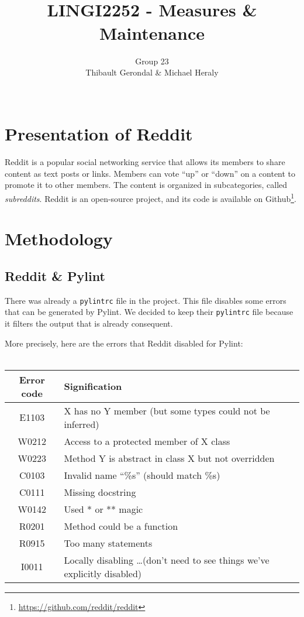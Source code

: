 \documentclass[11pt, a4paper]{article}
\title{\tbf{UCL} \\
	LINGI2252 - Measures \& Maintenance}
\author{Group 23 \\
		Thibault Gerondal \& Michael Heraly \\
		\\
		\tit{Teacher: Kim Mens}}
\newcommand{\tit}[1]{\textit{#1}}
\newcommand{\pyl}{\textsf{Pylint}}
\begin{document}
\maketitle

\thispagestyle{empty}


\newpage
\section*{Presentation of Reddit}

Reddit is a popular social networking service that allows its members to share content as text posts or links.
Members can vote ``up'' or ``down'' on a content to promote it to other members.
The content is organized in subcategories, called \tit{subreddits}.
Reddit is an open-source project, and its code is available on Github\footnote{\url{https://github.com/reddit/reddit}}.


\section{Methodology}

\subsection*{Reddit \& \pyl{}}

There was already a \texttt{pylintrc} file in the project.
This file disables some errors that can be generated by \pyl{}.
We decided to keep their \texttt{pylintrc} file because it filters the output that is already consequent.

\smallskip
More precisely, here are the errors that Reddit disabled for \pyl{}: \\
\\
\begin{tabular}{|c|m{10cm}|}
\hline
\textbf{\small{Error code}} & \textbf{\small{Signification}} \\
\hline
\hline
E1103 	& X has no Y member (but some types could not be inferred) \\
\hline
W0212 	& Access to a protected member of X class \\
\hline
W0223	& Method Y is abstract in class X but not overridden \\
\hline
C0103	& Invalid name ``\%s'' (should match \%s) \\
\hline
C0111	& Missing docstring \\
\hline
W0142	& Used * or ** magic \\
\hline
R0201	& Method could be a function \\
\hline
R0915	& Too many statements \\
\hline
I0011	& Locally disabling \dots (don't need to see things we've explicitly disabled) \\
\hline
\end{tabular}
\end{document}
